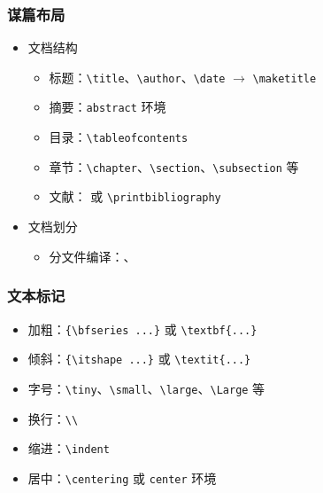 \begin{frame}[fragile]
    \frametitle{谋篇布局}
    \begin{itemize}
        \item 文档结构
              \begin{itemize}
                  \item 标题：\verb|\title|、\verb|\author|、\verb|\date| $\to$ \verb|\maketitle|
                  \item 摘要：\verb|abstract| 环境
                  \item 目录：\verb|\tableofcontents|
                  \item 章节：\verb|\chapter|、\verb|\section|、\verb|\subsection| 等
                  \item 文献：\verb|| 或 \verb|\printbibliography|
              \end{itemize}
        \item 文档划分
              \begin{itemize}
                  \item 分文件编译：\verb||、\verb||
              \end{itemize}
    \end{itemize}
\end{frame}

\begin{frame}[fragile]
    \frametitle{文本标记}
    \begin{itemize}
        \item 加粗：\verb|{\bfseries ...}| 或 \verb|\textbf{...}|
        \item 倾斜：\verb|{\itshape ...}| 或 \verb|\textit{...}|
        \item 字号：\verb|\tiny|、\verb|\small|、\verb|\large|、\verb|\Large| 等
        \item 换行：\verb|\\|
        \item 缩进：\verb|\indent|
        \item 居中：\verb|\centering| 或 \verb|center| 环境
    \end{itemize}
\end{frame}

